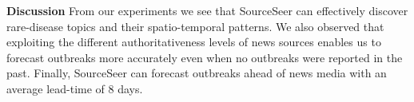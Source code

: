 \documentclass[twoside,leqno,twocolumn]{article}
\newcommand{\fullmodel}{{{\sf SourceSeer}}\xspace}
\newcommand{\locationmodel}{{\sf LocSeer}\xspace}
\newcommand{\keymodel}{{\sf KeyWord}\xspace}
\begin{document}

\vspace{2pt}\noindent\textbf{Discussion}
From our experiments we see that \fullmodel can effectively discover rare-disease topics and their spatio-temporal patterns. We also observed that exploiting the different authoritativeness levels of news sources enables us to forecast outbreaks more accurately even when no outbreaks were reported in the past. Finally, \fullmodel can forecast outbreaks ahead of news media with an average lead-time of 8 days.

%
\end{document}
